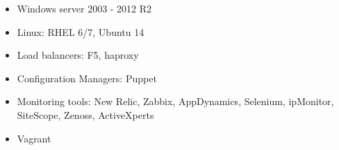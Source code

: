 \begin{multicols}{2}
	\begin{itemize}
		\item Windows server 2003 - 2012 R2
		\item Linux: RHEL 6/7, Ubuntu 14
		\item Load balancers: F5, haproxy
		\item Configuration Managers: Puppet
		\item Monitoring tools: New Relic, Zabbix, AppDynamics, Selenium, ipMonitor, SiteScope, Zenoss, ActiveXperts
		\item Vagrant
	\end{itemize}
	\vspace*{\fill}
\end{multicols}